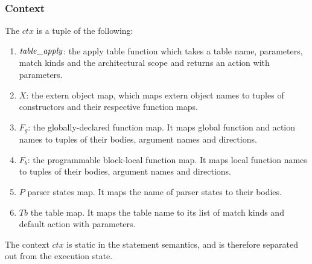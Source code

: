 \documentclass[UTF8]{article}
\begin{document}
\subsubsection*{Context}
 The $ctx$ is a tuple of the following: 
\begin{enumerate}
   \item $\mathit{table\_apply}$: the apply table function which takes a table name, parameters, match kinds and the architectural scope and returns an action with parameters.
   \item $X$: the extern object map, which maps extern object names to tuples of constructors and their respective function maps.
   \item $F_g$: the globally-declared function map. It maps global function and action names to tuples of their bodies, argument names and directions. 
   \item $F_b$: the programmable block-local function map.  It maps local function names to tuples of their bodies, argument names and directions. 
   \item $P$ parser states map. It maps the name of parser states to their bodies.
   \item $Tb$ the table map. It maps the table name to its list of match kinds and default action with parameters.
\end{enumerate}

The context $ctx$ is static in the statement semantics, and is therefore separated out from the execution state.




\newpage
\end{document}
